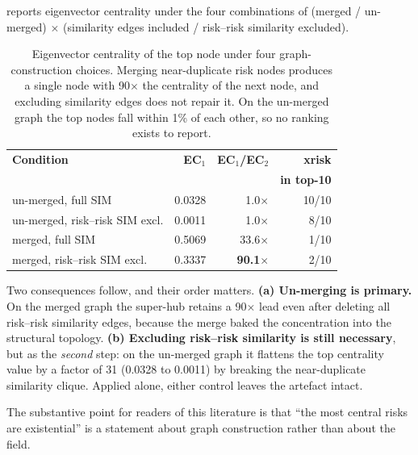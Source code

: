 \documentclass[10pt,twocolumn,letterpaper]{article}
\begin{document}
 reports eigenvector centrality under the four combinations of (merged /
un-merged) $\times$ (similarity edges included / risk--risk similarity excluded).

\begin{table}[t]
\centering
\small
\begin{tabular}{lrrr}
\toprule
\textbf{Condition} & \textbf{EC$_1$} & \textbf{EC$_1$/EC$_2$} & \textbf{xrisk} \\
                   &                 &                        & \textbf{in top-10} \\
\midrule
un-merged, full SIM             & 0.0328 & 1.0$\times$ & 10/10 \\
un-merged, risk--risk SIM excl. & 0.0011 & 1.0$\times$ & 8/10 \\
merged, full SIM                & 0.5069 & 33.6$\times$ & 1/10 \\
merged, risk--risk SIM excl.    & 0.3337 & \textbf{90.1$\times$} & 2/10 \\
\bottomrule
\end{tabular}
\caption{Eigenvector centrality of the top node under four graph-construction choices.
Merging near-duplicate risk nodes produces a single node with 90$\times$ the centrality
of the next node, and excluding similarity edges does not repair it. On the un-merged
graph the top nodes fall within 1\% of each other, so no ranking exists to report.}
\label{tab:ec}
\end{table}

Two consequences follow, and their order matters. \textbf{(a) Un-merging is primary.} On
the merged graph the super-hub retains a 90$\times$ lead even after deleting all
risk--risk similarity edges, because the merge baked the concentration into the
structural topology. \textbf{(b) Excluding risk--risk similarity is still necessary},
but as the \emph{second} step: on the un-merged graph it flattens the top centrality
value by a factor of 31 (0.0328 to 0.0011) by breaking the near-duplicate similarity
clique. Applied alone, either control leaves the artefact intact.

The substantive point for readers of this literature is that ``the most central risks
are existential'' is a statement about graph construction rather than about the field.
\end{document}
